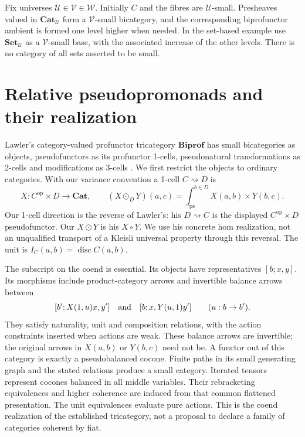 \documentclass[11pt]{article}
\theoremstyle{definition}
\newcommand{\Cat}{\mathbf{Cat}}
\newcommand{\Set}{\mathbf{Set}}
\newcommand{\Biprof}{\mathbf{Biprof}}
\newcommand{\disc}{\operatorname{disc}}
\newcommand{\coend}[1]{\int_{\mathrm{ps}}^{#1}}
\begin{document}
Fix universes $\mathcal U\in\mathcal V\in\mathcal W$. Initially $C$ and the
fibres are $\mathcal U$-small. Presheaves valued in $\Cat_{\mathcal U}$ form
a $\mathcal V$-small bicategory, and the corresponding biprofunctor ambient is
formed one level higher when needed. In the set-based example use
$\Set_{\mathcal U}$ as a $\mathcal V$-small base, with the associated increase
of the other levels. There is no category of all sets asserted to be small.

\section{Relative pseudopromonads and their realization}\label{sec:ambient}

Lawler's category-valued profunctor tricategory $\Biprof$ has small
bicategories as objects, pseudofunctors as its profunctor 1-cells,
pseudonatural transformations as 2-cells and modifications as 3-cells
\cite[Section 4.1.1]{Lawler}. We first restrict the objects to ordinary
categories. With our variance convention a 1-cell $C\rightsquigarrow D$ is
\[
 X:C^{\mathrm{op}}\times D\longrightarrow\Cat,
 \qquad
 (X\odot_D Y)(a,c)=\coend{b\in D}X(a,b)\times Y(b,c).
\]
Our 1-cell direction is the reverse of Lawler's: his $D\rightsquigarrow C$
is the displayed $C^{\mathrm{op}}\times D$ pseudofunctor. Our $X\odot Y$
is his $X\circ Y$. We use his concrete hom realization, not an unqualified
transport of a Kleisli universal property through this reversal. The unit is $I_C(a,b)=\disc C(a,b)$.

The subscript on the coend is essential. Its objects have representatives
$[b;x,y]$. Its morphisms include product-category arrows and invertible
balance arrows between
\[
 [b';X(1,u)x,y']\quad\hbox{and}\quad[b;x,Y(u,1)y']
 \qquad (u:b\to b').
\]
They satisfy naturality, unit and composition relations, with the action
constraints inserted when actions are weak. These balance arrows are
invertible; the original arrows in $X(a,b)$ or $Y(b,c)$ need not be.
A functor out of this category is exactly a pseudobalanced cocone. Finite
paths in its small generating graph and the stated relations produce a small
category. Iterated tensors represent cocones balanced in all middle variables.
Their rebracketing equivalences and higher coherence are induced from that
common flattened presentation. The unit equivalences evaluate pure actions.
This is the coend realization of the established tricategory, not a proposal
to declare a family of categories coherent by fiat.
\end{document}
